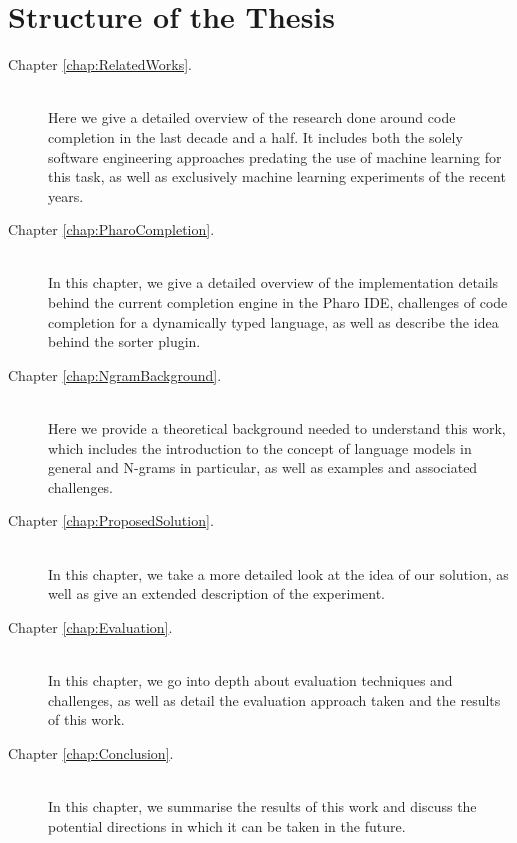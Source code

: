 \section{Structure of the Thesis}
\label{sec:Introduction-Structure}
{\hypersetup{linkcolor=black}
\begin{description}
	\item [Chapter \ref{chap:RelatedWorks}. ] \hfill \\
	Here we give a detailed overview of the research done around code completion in the last decade and a half. It includes both the solely software engineering approaches predating the use of machine learning for this task, as well as exclusively machine learning experiments of the recent years.
    \item [Chapter \ref{chap:PharoCompletion}. ] \hfill \\
	In this chapter, we give a detailed overview of the implementation details behind the current completion engine in the Pharo IDE, challenges of code completion for a dynamically typed language, as well as describe the idea behind the sorter plugin.
	\item [Chapter \ref{chap:NgramBackground}. ] \hfill \\
    Here we provide a theoretical background needed to understand this work, which includes the introduction to the concept of language models in general and N-grams in particular, as well as examples and associated challenges.
    \item [Chapter \ref{chap:ProposedSolution}. ] \hfill \\
	In this chapter, we take a more detailed look at the idea of our solution, as well as give an extended description of the experiment.
	\item [Chapter \ref{chap:Evaluation}. ] \hfill \\
    In this chapter, we go into depth about evaluation techniques and challenges, as well as detail the evaluation approach taken and the results of this work.
    \item [Chapter \ref{chap:Conclusion}. ] \hfill \\
	In this chapter, we summarise the results of this work and discuss the potential directions in which it can be taken in the future.
\end{description}
}